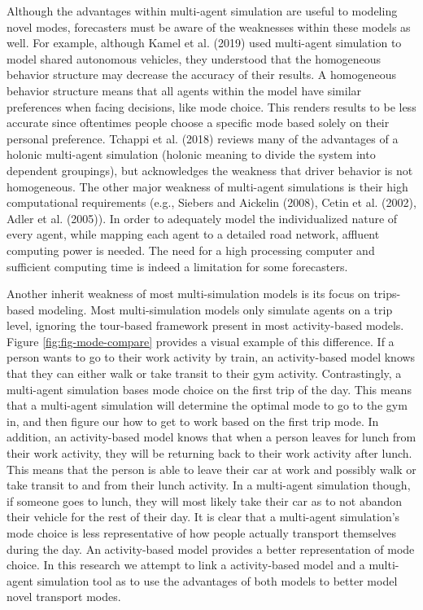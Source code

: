 \documentclass[12pt, oneside, openright]{byuthesis}
\begin{document}
Although the advantages within multi-agent simulation are useful to modeling novel modes, forecasters must be aware of the weaknesses within these models as well. For example, although Kamel et al. (2019) used multi-agent simulation to model shared autonomous vehicles, they understood that the homogeneous behavior structure may decrease the accuracy of their results. A homogeneous behavior structure means that all agents within the model have similar preferences when facing decisions, like mode choice. This renders results to be less accurate since oftentimes people choose a specific mode based solely on their personal preference. Tchappi et al. (2018) reviews many of the advantages of a holonic multi-agent simulation (holonic meaning to divide the system into dependent groupings), but acknowledges the weakness that driver behavior is not homogeneous. The other major weakness of multi-agent simulations is their high computational requirements (e.g., Siebers and Aickelin (2008), Cetin et al. (2002), Adler et al. (2005)). In order to adequately model the individualized nature of every agent, while mapping each agent to a detailed road network, affluent computing power is needed. The need for a high processing computer and sufficient computing time is indeed a limitation for some forecasters.

Another inherit weakness of most multi-simulation models is its focus on trips-based modeling. Most multi-simulation models only simulate agents on a trip level, ignoring the tour-based framework present in most activity-based models. Figure \ref{fig:fig-mode-compare} provides a visual example of this difference. If a person wants to go to their work activity by train, an activity-based model knows that they can either walk or take transit to their gym activity. Contrastingly, a multi-agent simulation bases mode choice on the first trip of the day. This means that a multi-agent simulation will determine the optimal mode to go to the gym in, and then figure our how to get to work based on the first trip mode. In addition, an activity-based model knows that when a person leaves for lunch from their work activity, they will be returning back to their work activity after lunch. This means that the person is able to leave their car at work and possibly walk or take transit to and from their lunch activity. In a multi-agent simulation though, if someone goes to lunch, they will most likely take their car as to not abandon their vehicle for the rest of their day. It is clear that a multi-agent simulation's mode choice is less representative of how people actually transport themselves during the day. An activity-based model provides a better representation of mode choice. In this research we attempt to link a activity-based model and a multi-agent simulation tool as to use the advantages of both models to better model novel transport modes.
\end{document}
